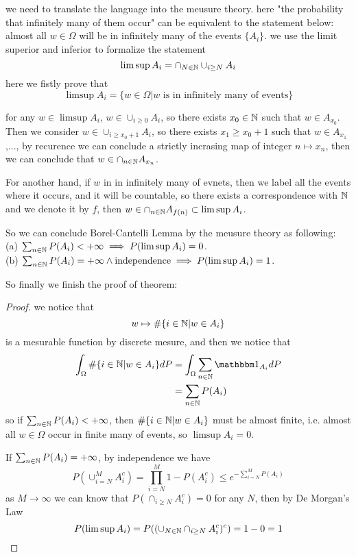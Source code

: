 \documentclass[en,geye,blue,pc,12pt]{elegantnote}
\begin{document}
we need to translate the language into the meusure theory. here "the probability that infinitely many of them occur" can be equivalent to the statement below: almost all \(w \in \Omega\) will be in infinitely many of the events \(\{A_i\}\). we use the limit superior and inferior to formalize the statement
\[\limsup A_i  = \cap_{N \in \mathbb{N}}\cup_{i \geq N}A_i\]
here we fistly prove that
\[\limsup A_i = \{w \in \Omega | w \text{ is  in infinitely many of events}\}\]

for any \(w \in \limsup A_i\), \(w \in \cup_{i \geq 0}A_i\), so there exists \(x_0 \in \mathbb{N}\) such that \(w \in A_{x_0}\). Then we consider \(w \in \cup_{i \geq x_0 +1 } A_i\), so there exists \(x_1 \geq x_0+1\) such that \(w \in A_{x_1}\),..., by recurence we can conclude a strictly incrasing map of integer \(n \mapsto x_n\), then we can conclude that \(w \in \cap_{n \in \mathbb{N}}A_{x_n}\).

For another hand, if \(w\) in in infinitely many of evnets, then we label all the events where it occurs, and it will be countable, so there exists a correspondence with \(\mathbb{N}\) and we denote it by \(f\), then \(w \in \cap_{n \in \mathbb{N}}A_{f(n)} \subset \limsup A_i\).

So we can conclude Borel-Cantelli Lemma by the meusure theory as following:
\\(a) \(\sum_{n \in \mathbb{N}} P(A_i) < +\infty  \implies P(\limsup A_i) = 0\).
\\(b) \(\sum_{n \in \mathbb{N}} P(A_i) = +\infty \land  \text{independence} \implies P(\limsup A_i) = 1 \).

So finally we finish the proof of theorem:
\begin{proof}
    we notice that 
    \[w \mapsto \# \{i \in \mathbb{N}| w \in A_i\}\]
    is a mesurable function by discrete mesure, and then we notice that 
    \begin{align*}
        \int_{\Omega}\# \{i \in \n| w \in A_i\} dP &= \int_{\Omega} \sum_{\ninn} \cha_{A_i}dP \\
        & = \sum_{\ninn}P(A_i)
    \end{align*}
    so if \(\sum_{n \in \mathbb{N}} P(A_i) < +\infty\), then \(\# \{i \in \mathbb{N}| w \in A_i\}\) must be almost finite, i.e. almost all \(w \in \Omega\) occur in finite many of events, so \(\limsup A_i = 0\).

    If \(\sum_{n \in \mathbb{N}} P(A_i) = +\infty\), by independence we have 
    \[P({\cup_{i=N}^M A_i^c }) = \prod_{i=N}^M 1-P(A_i^c) \leq e^{-\sum_{i=N}^M P(A_i)}\]
    as \(M \rightarrow \infty\) we can know that \(P(\cap_{i \geq N}A_i^c) = 0\) for any \(N\), then by De Morgan's Law
    \[P(\limsup A_i) = P((\cup_{N \in \mathbb{N}}\cap_{i\geq N}A_i^c)^c) = 1 - 0 = 1\] 
\end{proof}
\end{document}
